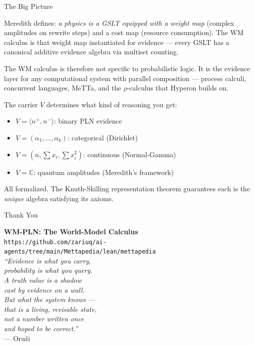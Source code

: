\documentclass[aspectratio=169,11pt]{beamer}
\begin{document}
\begin{frame}{The Big Picture}

Meredith defines: \emph{a physics is a GSLT equipped with a
weight map} (complex amplitudes on rewrite steps) and a cost map
(resource consumption). The WM calculus is that weight map
instantiated for evidence --- every GSLT has a canonical additive
evidence algebra via multiset counting.

\bigskip
The WM calculus is therefore not specific to probabilistic logic.
It is the \alert{evidence layer for any computational system}
with parallel composition --- process calculi, concurrent
languages, MeTTa, and the $\rho$-calculus that Hyperon builds on.

\bigskip
The carrier $V$ determines what kind of reasoning you get:
\begin{itemize}
\item $V = \langle n^+, n^- \rangle$: binary PLN evidence
\item $V = (\alpha_1, \ldots, \alpha_k)$: categorical (Dirichlet)
\item $V = (n, \sum x_i, \sum x_i^2)$: continuous (Normal-Gamma)
\item $V = \mathbb{C}$: quantum amplitudes (Meredith's framework)
\end{itemize}
All formalized.  The Knuth-Skilling representation theorem
guarantees each is the \emph{unique} algebra satisfying its
axioms.

\end{frame}

\begin{frame}{Thank You}

\begin{center}
\large\textbf{WM-PLN: The World-Model Calculus}\\[12pt]

\normalsize
\texttt{https://github.com/zariuq/ai-agents/tree/main/Mettapedia/lean/mettapedia}\\[12pt]

\textit{``Evidence is what you carry,\\
probability is what you query.\\[4pt]
A truth value is a shadow\\
cast by evidence on a wall.\\
But what the system knows ---\\
that is a living, revisable state,\\
not a number written once\\
and hoped to be correct.''}\\[6pt]
--- Oru\v{z}i
\end{center}

\end{frame}
\end{document}
